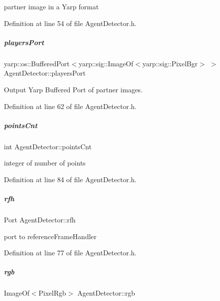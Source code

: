 partner image in a Yarp format 



Definition at line 54 of file Agent\+Detector.\+h.

\mbox{\label{group__agentDetector_ab6de38a8d44bdebe0007e411dddb0e9a}} 
\subparagraph{\texorpdfstring{players\+Port}{playersPort}}
{\footnotesize\ttfamily yarp\+::os\+::\+Buffered\+Port$<$yarp\+::sig\+::\+Image\+Of$<$yarp\+::sig\+::\+Pixel\+Bgr$>$ $>$ Agent\+Detector\+::players\+Port\hspace{0.3cm}{\ttfamily [protected]}}



Output Yarp Buffered Port of partner images. 



Definition at line 62 of file Agent\+Detector.\+h.

\mbox{\label{group__agentDetector_a4b18a14345740285b71b1287b2c430fc}} 
\subparagraph{\texorpdfstring{points\+Cnt}{pointsCnt}}
{\footnotesize\ttfamily int Agent\+Detector\+::points\+Cnt\hspace{0.3cm}{\ttfamily [protected]}}



integer of number of points 



Definition at line 84 of file Agent\+Detector.\+h.

\mbox{\label{group__agentDetector_add076c0ba22e85ce107773f11948d771}} 
\subparagraph{\texorpdfstring{rfh}{rfh}}
{\footnotesize\ttfamily Port Agent\+Detector\+::rfh\hspace{0.3cm}{\ttfamily [protected]}}



port to reference\+Frame\+Handler 



Definition at line 77 of file Agent\+Detector.\+h.

\mbox{\label{group__agentDetector_a6dded50135450c781366c97ab9b81bd6}} 
\subparagraph{\texorpdfstring{rgb}{rgb}}
{\footnotesize\ttfamily Image\+Of$<$Pixel\+Rgb$>$ Agent\+Detector\+::rgb\hspace{0.3cm}{\ttfamily [protected]}}



